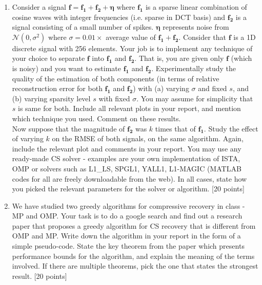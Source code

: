 \documentclass[11pt]{article}
\begin{document}
\begin{enumerate}
\item Consider a signal $\boldsymbol{f} = \boldsymbol{f_1} + \boldsymbol{f_2} + \boldsymbol{\eta}$ where $\boldsymbol{f_1}$ is a sparse linear combination of cosine waves with integer frequencies (i.e. sparse in DCT basis) and $\boldsymbol{f_2}$ is a signal consisting of a small number of spikes. $\boldsymbol{\eta}$ represents noise from $\mathcal{N}(0,\sigma^2)$ where $\sigma = 0.01 \times $ average value of $\boldsymbol{f_1} + \boldsymbol{f_2}$. Consider that $\boldsymbol{f}$ is a 1D discrete signal with 256 elements. Your job is to implement any technique of your choice to separate $\boldsymbol{f}$ into $\boldsymbol{f_1}$ and $\boldsymbol{f_2}$. That is, you are given only $\boldsymbol{f}$ (which is noisy) and you want to estimate $\boldsymbol{f_1}$ and $\boldsymbol{f_2}$. Experimentally study the quality of the estimation of both components (in terms of relative reconstruction error for both $\boldsymbol{f_1}$ and $\boldsymbol{f_2}$) with (a) varying $\sigma$ and fixed $s$, and (b) varying sparsity level $s$ with fixed $\sigma$. You may assume for simplicity that $s$ is same for both. Include all relevant plots in your report, and mention which technique you used. Comment on these results. \\
Now suppose that the magnitude of $\boldsymbol{f_2}$ was $k$ times that of $\boldsymbol{f_1}$. Study the effect of varying $k$ on the RMSE of both signals, on the same algorithm. Again, include the relevant plot and comments in your report. You may use any ready-made CS solver - examples are your own implementation of ISTA, OMP or solvers such as L1\_LS, SPGL1, YALL1, L1-MAGIC (MATLAB codes for all are freely downloadable from the web). In all cases, state how you picked the relevant parameters for the solver or algorithm. \textsf{[20 points]}

\item We have studied two greedy algorithms for compressive recovery in class - MP and OMP. Your task is to do a google search and find out a research paper that proposes a greedy algorithm for CS recovery that is different from OMP and MP. Write down the algorithm in your report in the form of a simple pseudo-code. State the key theorem from the paper which presents performance bounds for the algorithm, and explain the meaning of the terms involved. If there are multiple theorems, pick the one that states the strongest result. \textsf{[20 points]}


\end{enumerate}
\end{document}
